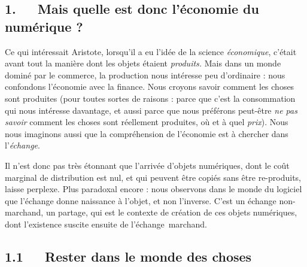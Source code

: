 \documentclass{FramateX}
\begin{document}
\begin{refsection}
\section*{1.~~~Mais quelle est donc l'économie du numérique ?}
{}

Ce qui intéressait Aristote, lorsqu'il a eu l'idée de la science
\textit{économique}, c'était avant tout la manière dont les objets
étaient \textit{produits.} Mais dans un monde dominé par le commerce,
la production nous intéresse peu d'ordinaire : nous confondons
l'économie avec la finance. Nous croyons savoir comment les choses sont
produites (pour toutes sortes de raisons : parce que c'est la
consommation qui nous intéresse davantage, et aussi parce que nous
préférons peut-être \textit{ne pas }\textit{savoir} comment les choses
sont réellement produites, où et à quel \textit{prix}). Nous nous
imaginons aussi que la compréhension de l'économie est à chercher
dans l'\textit{échange}. 

Il n'est donc pas très étonnant que l'arrivée d'objets numériques, dont
le coût marginal de distribution est nul, et qui peuvent être copiés
sans être re-produits, laisse perplexe. Plus paradoxal encore : nous
observons dans le monde du logiciel que l'échange donne naissance à
l'objet, et non l'inverse. C'est un échange non-marchand, un partage,
qui est le contexte de création de ces objets numériques, dont
l'existence suscite ensuite de l'échange~marchand.

\subsection*{1.1~~~Rester dans le monde des choses}
{}



\end{refsection}
\end{document}
